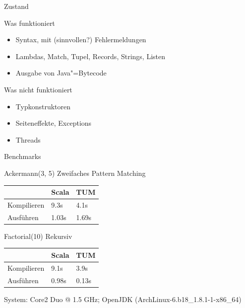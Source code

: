 \documentclass[hyperref={pdfpagelabels=false}]{beamer}
\begin{document}
\begin{frame}{Zustand}
  \begin{exampleblock}{Was funktioniert}
    \begin{itemize}
      \item Syntax, mit (sinnvollen?) Fehlermeldungen
      \item Lambdas, Match, Tupel, Records, Strings, Listen
      \item Ausgabe von Java"=Bytecode
    \end{itemize}
  \end{exampleblock}
  \begin{alertblock}{Was nicht funktioniert}
    \begin{itemize}
      \item Typkonstruktoren
      \item Seiteneffekte, Exceptions
      \item Threads
    \end{itemize}
  \end{alertblock}
\end{frame}

\begin{frame}{Benchmarks}
  \begin{block}{Ackermann(3, 5)}
    Zweifaches Pattern Matching

    \begin{tabular}{l|l|l}
       & Scala & TUM \\
      \hline
      Kompilieren & \textcolor{slowest}{9.3s} & \textcolor{fastest}{4.1s} \\
      Ausführen & \textcolor{fastest}{1.03s} & \textcolor{slowest}{1.69s} \\
    \end{tabular}
  \end{block}
  \begin{block}{Factorial(10)}
    Rekursiv

    \begin{tabular}{l|l|l}
       & Scala & TUM \\
      \hline
      Kompilieren & \textcolor{slowest}{9.1s} & \textcolor{fastest}{3.9s} \\
      Ausführen & \textcolor{slowest}{0.98s} & \textcolor{fastest}{0.13s} \\
    \end{tabular}
  \end{block}
  System: Core2 Duo @ 1.5 GHz; OpenJDK (ArchLinux-6.b18\_1.8.1-1-x86\_64)
\end{frame}
\end{document}
